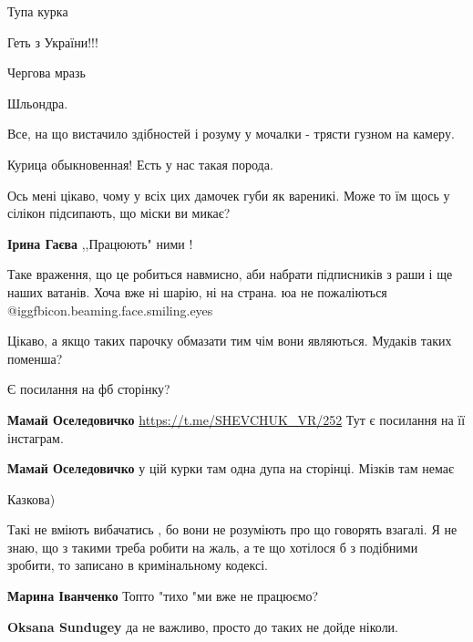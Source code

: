 \begin{itemize}
Тупа курка

Геть з України!!!

Чергова мразь

Шльондра.

Все, на що вистачило здібностей і розуму у мочалки - трясти гузном на камеру.

Курица обыкновенная! Есть у нас такая порода.


Ось мені цікаво, чому у всіх цих дамочек губи як вареникі. Може то їм щось у
сілікон підсипають, що міски ви микає?

\begin{itemize} %
\textbf{Ірина Гаєва} ,,Працюють" ними !
\end{itemize} %

Таке враження, що це робиться навмисно, аби набрати підписників з раши і ще наших ватанів. Хоча вже ні шарію, ні на страна. юа не пожаліються  @igg{fbicon.beaming.face.smiling.eyes} 

Цікаво, а якщо таких парочку обмазати тим чім вони являються. Мудаків таких поменша?

Є посилання на фб сторінку?

\begin{itemize} %
\textbf{Мамай Оселедовичко}
\url{https://t.me/SHEVCHUK_VR/252}
Тут є посилання на її інстаграм.

\textbf{Мамай Оселедовичко} у цій курки там одна дупа на сторінці. Мізків там немає

\end{itemize} %

Казкова)


Такі не вміють вибачатись , бо вони не розуміють про що говорять взагалі. Я не
знаю, що з такими треба робити на жаль, а те що хотілося б з подібними зробити,
то записано в кримінальному кодексі.

\begin{itemize} %
\textbf{Марина Іванченко}
Топто "тихо "ми вже не працюємо?

\textbf{Oksana Sundugey} да не важливо, просто до таких не дойде ніколи.


\end{itemize}
\end{itemize}
